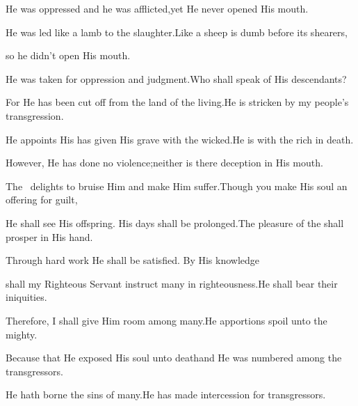 \begin{inparaenum}
  \pb{} He was oppressed and he was afflicted,\pa{}yet He never opened His mouth.%

  \pb{}He was led like a lamb to the slaughter.\pa{}Like a sheep is dumb before its shearers,%

  \pb{}so he didn't open His mouth.%

  \pa{} He was taken for oppression and judgment.\pa{}Who shall speak of His descendants?%

  \pb{}For He has been cut off from the land of the living.\pa{}He is stricken by my people's transgression.%

  \pa{} He appoints His has given His grave with the wicked.\pa{}He is with the rich in death.%

  \pb{}However, He has done no violence;\pa{}neither is there deception in His mouth.%

  \pb{} The \lord\ delights to bruise Him and make Him suffer.\pa{}Though you make His soul an offering for guilt,%

  \pb{}He shall see His offspring.%
  His days shall be prolonged.\pa{}The pleasure of the \lord{} shall prosper in His hand.%

  \pa{} Through hard work He shall be satisfied.%
  \pa{}By His knowledge%

  \pb{}shall my Righteous Servant instruct many in righteousness.\pa{}He shall bear their iniquities.%

  \pa{} Therefore, I shall give Him room among many.\pa{}He apportions spoil unto the mighty.%

  \pb{}Because that He exposed His soul unto death\pa{}and He was numbered among the transgressors.%

  \pb{}He hath borne the sins of many.\pa{}He has made intercession for transgressors.%
\end{inparaenum}
